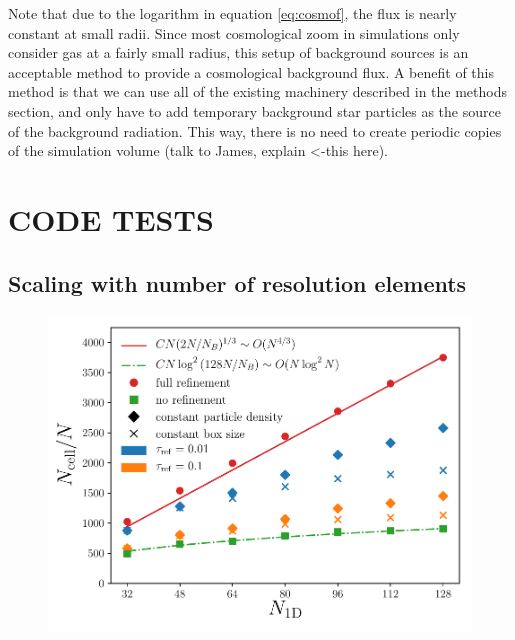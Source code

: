 \documentclass[fleq,usenatbib]{mnras}
\begin{document}
Note that due to the logarithm in equation \ref{eq:cosmof}, the flux is nearly 
constant at small radii. Since most cosmological zoom in simulations only 
consider gas at a fairly small radius, this setup of background sources is an 
acceptable method to provide a cosmological background flux. A benefit of this 
method is that we can use all of the existing machinery described in the 
methods section, and only have to add temporary background star particles as 
the source of the background radiation. This way, there is no need to create 
periodic copies of the simulation volume (talk to James, explain <-this here).





\section{CODE TESTS}\label{sec:tsts}
\subsection{Scaling with number of resolution elements}
\begin{figure}
\includegraphics[width=1\linewidth]{Figures/particle_scaling.pdf}
\caption{}
\label{fig:pscale}
\end{figure}
\end{document}
